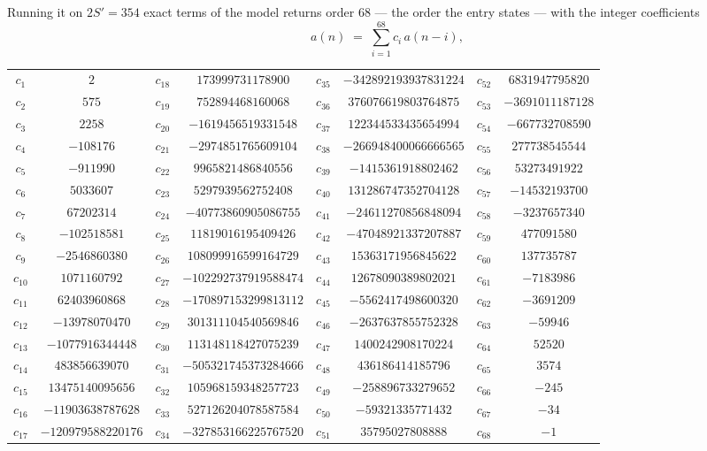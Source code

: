 \documentclass[11pt,a4paper]{article}
\theoremstyle{plain}
\theoremstyle{definition}
\begin{document}
Running it on $2S'=354$ exact terms of the model returns order $68$ --- the order the
entry states --- with the integer coefficients
\[
a(n)\;=\;\sum_{i=1}^{68}c_i\,a(n-i),
\]
\begin{center}\small
\begin{tabular}{cccccccc}
$c_{1}$ & $2$ & $c_{18}$ & $173999731178900$ & $c_{35}$ & $-342892193937831224$ & $c_{52}$ & $6831947795820$ \\
$c_{2}$ & $575$ & $c_{19}$ & $752894468160068$ & $c_{36}$ & $376076619803764875$ & $c_{53}$ & $-3691011187128$ \\
$c_{3}$ & $2258$ & $c_{20}$ & $-1619456519331548$ & $c_{37}$ & $122344533435654994$ & $c_{54}$ & $-667732708590$ \\
$c_{4}$ & $-108176$ & $c_{21}$ & $-2974851765609104$ & $c_{38}$ & $-266948400066666565$ & $c_{55}$ & $277738545544$ \\
$c_{5}$ & $-911990$ & $c_{22}$ & $9965821486840556$ & $c_{39}$ & $-1415361918802462$ & $c_{56}$ & $53273491922$ \\
$c_{6}$ & $5033607$ & $c_{23}$ & $5297939562752408$ & $c_{40}$ & $131286747352704128$ & $c_{57}$ & $-14532193700$ \\
$c_{7}$ & $67202314$ & $c_{24}$ & $-40773860905086755$ & $c_{41}$ & $-24611270856848094$ & $c_{58}$ & $-3237657340$ \\
$c_{8}$ & $-102518581$ & $c_{25}$ & $11819016195409426$ & $c_{42}$ & $-47048921337207887$ & $c_{59}$ & $477091580$ \\
$c_{9}$ & $-2546860380$ & $c_{26}$ & $108099916599164729$ & $c_{43}$ & $15363171956845622$ & $c_{60}$ & $137735787$ \\
$c_{10}$ & $1071160792$ & $c_{27}$ & $-102292737919588474$ & $c_{44}$ & $12678090389802021$ & $c_{61}$ & $-7183986$ \\
$c_{11}$ & $62403960868$ & $c_{28}$ & $-170897153299813112$ & $c_{45}$ & $-5562417498600320$ & $c_{62}$ & $-3691209$ \\
$c_{12}$ & $-13978070470$ & $c_{29}$ & $301311104540569846$ & $c_{46}$ & $-2637637855752328$ & $c_{63}$ & $-59946$ \\
$c_{13}$ & $-1077916344448$ & $c_{30}$ & $113148118427075239$ & $c_{47}$ & $1400242908170224$ & $c_{64}$ & $52520$ \\
$c_{14}$ & $483856639070$ & $c_{31}$ & $-505321745373284666$ & $c_{48}$ & $436186414185796$ & $c_{65}$ & $3574$ \\
$c_{15}$ & $13475140095656$ & $c_{32}$ & $105968159348257723$ & $c_{49}$ & $-258896733279652$ & $c_{66}$ & $-245$ \\
$c_{16}$ & $-11903638787628$ & $c_{33}$ & $527126204078587584$ & $c_{50}$ & $-59321335771432$ & $c_{67}$ & $-34$ \\
$c_{17}$ & $-120979588220176$ & $c_{34}$ & $-327853166225767520$ & $c_{51}$ & $35795027808888$ & $c_{68}$ & $-1$ \\
\end{tabular}
\end{center}
\end{document}
